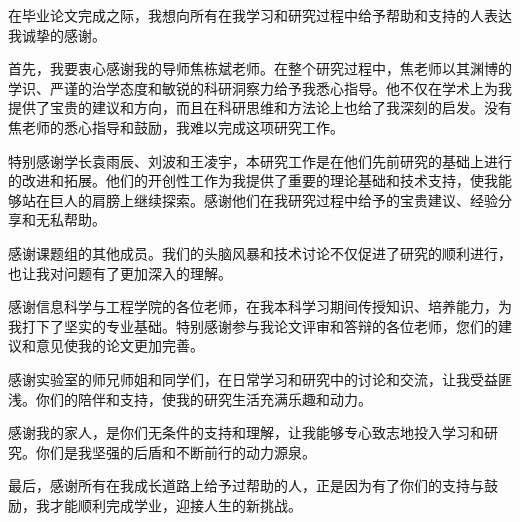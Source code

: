 \documentclass[AutoFakeBold]{LZUThesis}
\begin{document}
\Thanks

在毕业论文完成之际，我想向所有在我学习和研究过程中给予帮助和支持的人表达我诚挚的感谢。

首先，我要衷心感谢我的导师焦栋斌老师。在整个研究过程中，焦老师以其渊博的学识、严谨的治学态度和敏锐的科研洞察力给予我悉心指导。他不仅在学术上为我提供了宝贵的建议和方向，而且在科研思维和方法论上也给了我深刻的启发。没有焦老师的悉心指导和鼓励，我难以完成这项研究工作。

特别感谢学长袁雨辰、刘波和王凌宇，本研究工作是在他们先前研究的基础上进行的改进和拓展。他们的开创性工作为我提供了重要的理论基础和技术支持，使我能够站在巨人的肩膀上继续探索。感谢他们在我研究过程中给予的宝贵建议、经验分享和无私帮助。

感谢课题组的其他成员。我们的头脑风暴和技术讨论不仅促进了研究的顺利进行，也让我对问题有了更加深入的理解。

感谢信息科学与工程学院的各位老师，在我本科学习期间传授知识、培养能力，为我打下了坚实的专业基础。特别感谢参与我论文评审和答辩的各位老师，您们的建议和意见使我的论文更加完善。

感谢实验室的师兄师姐和同学们，在日常学习和研究中的讨论和交流，让我受益匪浅。你们的陪伴和支持，使我的研究生活充满乐趣和动力。

感谢我的家人，是你们无条件的支持和理解，让我能够专心致志地投入学习和研究。你们是我坚强的后盾和不断前行的动力源泉。

最后，感谢所有在我成长道路上给予过帮助的人，正是因为有了你们的支持与鼓励，我才能顺利完成学业，迎接人生的新挑战。

\Grade %
\end{document}
